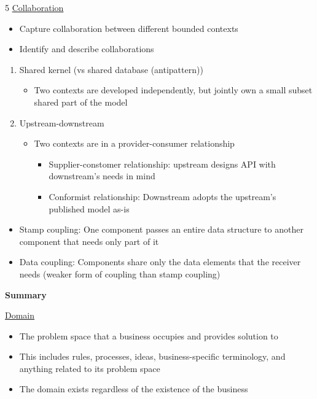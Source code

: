 \documentclass[landscape,a4paper]{extarticle}
\begin{document}
\begin{multicols*}{5}
    \uline{Collaboration}

    \begin{itemize}
        \item Capture collaboration between different bounded contexts
        \item Identify and describe collaborations
    \end{itemize}

    \begin{enumerate}
        \item Shared kernel (vs shared database (antipattern))
        \begin{itemize}
            \item Two contexts are developed independently, but jointly own a small subset shared part of the model
        \end{itemize}

        \item Upstream-downstream
        \begin{itemize}
            \item Two contexts are in a provider-consumer relationship
            \begin{itemize}
                \item Supplier-constomer relationship: upstream designs API with downstream's needs in mind
                \item Conformist relationship: Downstream adopts the upstream's published model as-is
            \end{itemize}
        \end{itemize}
    \end{enumerate}

    \begin{itemize}
        \item Stamp coupling: One component passes an entire data structure to
        another component that needs only part of it
        \item Data coupling: Components share only the data elements that the receiver needs
        (weaker form of coupling than stamp coupling)
    \end{itemize}

    \textbf{Summary}

    \uline{Domain}

    \begin{itemize}
        \item The problem space that a business occupies and provides solution to
        \item This includes rules, processes, ideas, business-specific terminology,
        and anything related to its problem space
        \item The domain exists regardless of the existence of the business
    \end{itemize}


\end{multicols*}
\end{document}

